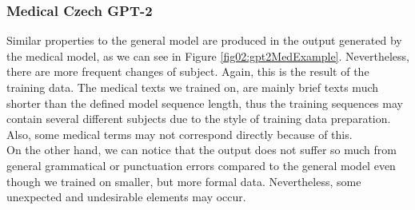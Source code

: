 \subsubsection*{Medical Czech GPT-2}
Similar properties to the general model are produced in the output generated by the medical model, as we can see in Figure \ref{fig02:gpt2MedExample}. Nevertheless, there are more frequent changes of subject. Again, this is the result of the training data. The medical texts we trained on, are mainly brief texts much shorter than the defined model sequence length, thus the training sequences may contain several different subjects due to the style of training data preparation. Also, some medical terms may not correspond directly because of this. \\

On the other hand, we can notice that the output does not suffer so much from general grammatical or punctuation errors compared to the general model even though we trained on smaller, but more formal data. Nevertheless, some unexpected and undesirable elements may occur.\\

